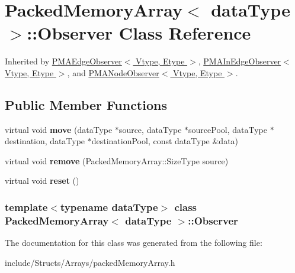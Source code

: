 \hypertarget{class_packed_memory_array_1_1_observer}{
\section{PackedMemoryArray$<$ dataType $>$::Observer Class Reference}
\label{class_packed_memory_array_1_1_observer}
}


Inherited by \hyperlink{class_p_m_a_edge_observer}{PMAEdgeObserver$<$ Vtype, Etype $>$}, \hyperlink{class_p_m_a_in_edge_observer}{PMAInEdgeObserver$<$ Vtype, Etype $>$}, and \hyperlink{class_p_m_a_node_observer}{PMANodeObserver$<$ Vtype, Etype $>$}.

\subsection*{Public Member Functions}
\begin{DoxyCompactItemize}
\item 
\hypertarget{class_packed_memory_array_1_1_observer_aadcb66a401ce00729a63ab4a1fe7f128}{
virtual void {\bfseries move} (dataType $\ast$source, dataType $\ast$sourcePool, dataType $\ast$destination, dataType $\ast$destinationPool, const dataType \&data)}
\label{class_packed_memory_array_1_1_observer_aadcb66a401ce00729a63ab4a1fe7f128}

\item 
\hypertarget{class_packed_memory_array_1_1_observer_a5e34c63eb6202947d63f99817819d5bd}{
virtual void {\bfseries remove} (PackedMemoryArray::SizeType source)}
\label{class_packed_memory_array_1_1_observer_a5e34c63eb6202947d63f99817819d5bd}

\item 
\hypertarget{class_packed_memory_array_1_1_observer_ae007bee5a017ffe086d079d142c91214}{
virtual void {\bfseries reset} ()}
\label{class_packed_memory_array_1_1_observer_ae007bee5a017ffe086d079d142c91214}

\end{DoxyCompactItemize}
\subsubsection*{template$<$typename dataType$>$ class PackedMemoryArray$<$ dataType $>$::Observer}



The documentation for this class was generated from the following file:\begin{DoxyCompactItemize}
\item 
include/Structs/Arrays/packedMemoryArray.h\end{DoxyCompactItemize}
